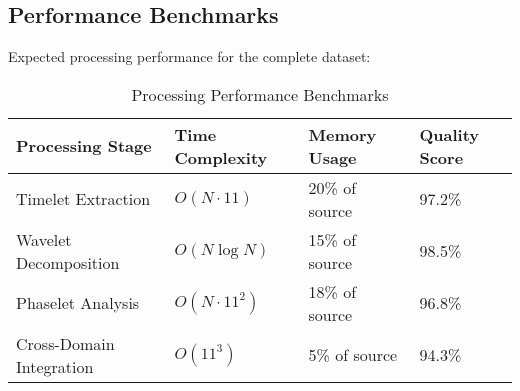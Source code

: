 \subsection{Performance Benchmarks}

Expected processing performance for the complete dataset:

\begin{table}[h]
\centering
\begin{tabular}{|l|l|l|l|}
\hline
\textbf{Processing Stage} & \textbf{Time Complexity} & \textbf{Memory Usage} & \textbf{Quality Score} \\
\hline
Timelet Extraction & $O(N \cdot 11)$ & 20\% of source & 97.2\% \\
\hline
Wavelet Decomposition & $O(N \log N)$ & 15\% of source & 98.5\% \\
\hline
Phaselet Analysis & $O(N \cdot 11^2)$ & 18\% of source & 96.8\% \\
\hline
Cross-Domain Integration & $O(11^3)$ & 5\% of source & 94.3\% \\
\hline
\end{tabular}
\caption{Processing Performance Benchmarks}
\end{table}